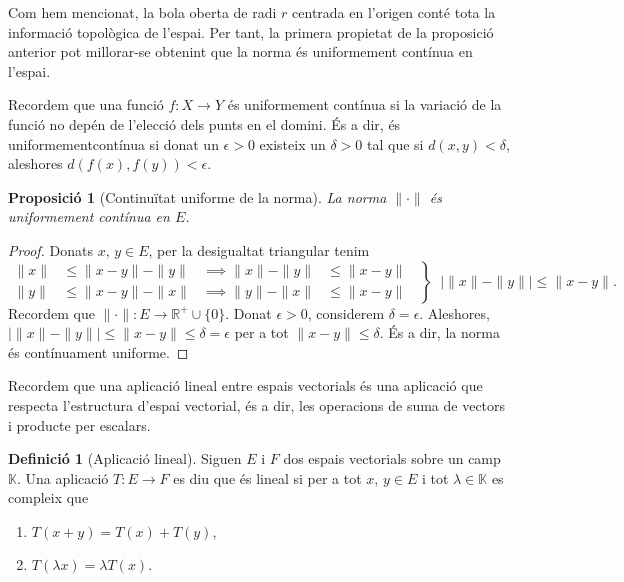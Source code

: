 \documentclass[12pt]{book}
\newtheorem{prop}[teorema]{Proposició}
\theoremstyle{definition}
\newtheorem{defi}[teorema]{Definició}
\theoremstyle{nota}
\theoremstyle{exemple}
\begin{document}
Com hem mencionat, la bola oberta de radi $r$ centrada en l'origen
conté tota la informació topològica de l'espai. Per tant, la primera
propietat de la proposició anterior pot millorar-se obtenint que la
norma és uniformement contínua en l'espai.

Recordem que una funció $f : X \to Y$ és uniformement contínua si la
variació de la funció no depén de l'elecció dels punts en el
domini. És a dir, és uniformementcontínua si donat un $\epsilon > 0$
existeix un $\delta > 0$ tal que si $d(x,y) < \delta$, aleshores
$d(f(x), f(y)) < \epsilon$.

\begin{prop}[Continuïtat uniforme de la norma]
  La norma $\|\cdot\|$ és uniformement contínua en $E$.
\end{prop}

\begin{proof}
  Donats $x, \, y \in E$, per la desigualtat triangular tenim
  \begin{equation*}
    \left.
      \begin{aligned}
        \|x\| &\leq \|x-y\| - \|y\| & \implies \|x\|-\|y\| &\leq \|x-y\| \\
        \|y\| &\leq \|x-y\| - \|x\| & \implies \|y\|-\|x\| &\leq \|x-y\|
      \end{aligned} \;\;
    \right\} \;\;
    \left| \|x\| - \|y\| \right| \leq \|x-y\|.
  \end{equation*}
  Recordem que $\|\cdot\| : E \to \mathbb{R}^+ \cup \{0\}$. Donat
  $\epsilon > 0$, considerem $\delta = \epsilon$. Aleshores,
  $\left| \|x\| - \|y\| \right| \leq \|x - y\| \leq \delta = \epsilon$
  per a tot $\|x-y\| \leq \delta$. És a dir, la norma és contínuament
  uniforme.
\end{proof}

Recordem que una aplicació lineal entre espais vectorials és una
aplicació que respecta l'estructura d'espai vectorial, és a dir, les
operacions de suma de vectors i producte per escalars.

\begin{defi}[Aplicació lineal]
  Siguen $E$ i $F$ dos espais vectorials sobre un camp
  $\mathbb{K}$. Una aplicació $T : E \to F$ es diu que és lineal si
  per a tot $x, \, y \in E$ i tot $\lambda \in \mathbb{K}$ es compleix
  que
  \begin{enumerate}[nosep]
  \item $T(x + y) = T(x) + T(y)$,
  \item $T(\lambda x) = \lambda T(x)$.
  \end{enumerate}
\end{defi}
\end{document}
